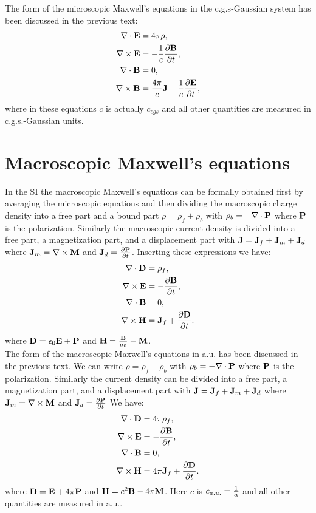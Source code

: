 \documentclass[12pt,a4paper]{article}
\begin{document}
{\color{orange} The form of the microscopic Maxwell's equations
in the c.g.s-Gaussian system has been discussed in the previous text:
\begin{align}
\nabla \cdot {\bf E} &= 4 \pi \rho, \\
\nabla \times {\bf E} &= -{1\over c} {\partial {\bf B} \over \partial t}, \\
\nabla \cdot {\bf B} &= 0, \\
\nabla \times {\bf B} &= {4 \pi \over c} {\bf J}+ {1\over c}
{\partial {\bf E} \over \partial t}, 
\end{align}
where in these equations $c$ is actually $c_{cgs}$ and all 
other quantities are measured in c.g.s.-Gaussian units.
}

\newpage
\section{\color{coral}Macroscopic Maxwell's equations}
In the SI the macroscopic Maxwell's equations can be formally obtained 
first by averaging the microscopic equations and then dividing the 
macroscopic charge density into a free part and a
bound part $\rho=\rho_f+\rho_b$ with $\rho_b=-\nabla \cdot {\bf P}$
where ${\bf P}$ is the polarization.
Similarly the macroscopic current density is divided into a free part, a 
magnetization part, 
and a displacement part with ${\bf J}={\bf J}_f + {\bf J}_m + {\bf J}_d$ where
${\bf J}_m=\nabla \times {\bf M}$ and ${\bf J}_d={\partial {\bf P}\over 
\partial t}$.
Inserting these expressions we have:
\begin{align}
\nabla \cdot {\bf D} &= \rho_f, \\
\nabla \times {\bf E} &= -{\partial {\bf B} \over \partial t}, \\
\nabla \cdot {\bf B} &= 0, \\
\nabla \times {\bf H} &= {\bf J}_f+ {\partial {\bf D} \over \partial t}. 
\end{align}
where ${\bf D}=\epsilon_0 {\bf E}+{\bf P}$ and ${\bf H}={{\bf B}\over \mu_0}-
{\bf M}$.
\\

{\color{web-blue} The form of the macroscopic Maxwell's equations
in a.u. has been discussed in the previous text.
We can write $\rho=\rho_f+\rho_b$ with $\rho_b=-\nabla \cdot {\bf P}$
where ${\bf P}$ is the polarization.
Similarly the current density can be divided into a free part, a magnetization
part,
and a displacement part with ${\bf J}={\bf J}_f + {\bf J}_m + {\bf J}_d$ where
${\bf J}_m=\nabla \times {\bf M}$ and ${\bf J}_d={\partial {\bf P}\over 
\partial t}$
We have:
\begin{align}
\nabla \cdot {\bf D} &= 4 \pi \rho_f, \\
\nabla \times {\bf E} &= -{\partial {\bf B} \over \partial t}, \\
\nabla \cdot {\bf B} &= 0, \\
\nabla \times {\bf H} &= 4 \pi {\bf J}_f+ {\partial {\bf D} \over 
\partial t}. 
\end{align}
where ${\bf D}={\bf E} + 4 \pi {\bf P}$ and ${\bf H}={c^2
{\bf B}}- 4 \pi {\bf M}$.
Here $c$ is $c_{a.u.}={1\over \alpha}$ and all other quantities are 
measured in a.u..
}
\\
\end{document}
